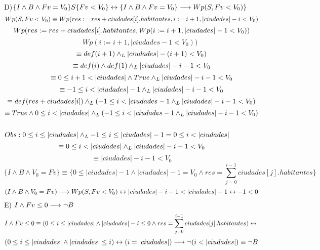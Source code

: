 \documentclass[10pt,a4paper]{article}
\begin{document}
D)$\{I \land B \land Fv = V_0\} S \{Fv < V_0\} \leftrightarrow \{I \land B \land Fv = V_0\} \longrightarrow Wp (S, Fv < V_0 )\}$\\
\[Wp(S,Fv < V_0 ) \equiv Wp(res:=res+ciudades[i].habitantes, i:=i+1,|ciudades|-i<V_0)\\ \]
\[Wp(res:= res+ciudades[i].habitantes, Wp(i:=i+1,|ciudades|-1< V_0))\\\]
\[\hspace{1cm}Wp(i:=i+1,|ciudades-1<V_0))  \]
\[\hspace{1cm}\equiv def (i+1) \land _L |ciudades|-(i+1) < V_0 )\]
\[\hspace{1cm}\equiv def(i) \land def(1) \land _L |ciudades|-i-1 < V_0 \]
\[\hspace{1cm}\equiv 0 \leq i+1< |ciudades| \land True \land _L |ciudades|-i-1 < V_0  \]
\[\hspace{1cm}\equiv -1 \leq i < |ciudades| -1 \land _L |ciudades|-i-1 < V_0  \\\]
\[\equiv def(res+ciudades[i]) \land _L (-1 \leq i < |ciudades -1 \land _L |ciudades|-i-1 < V_0)\]
\[\equiv True \land 0 \leq i < |ciudades| \land _L (-1 \leq i < |ciudades -1 \land _L |ciudades|-i-1 < V_0)\]
\\

$Obs: 0 \leq i \leq |ciudades| \land _L -1 \leq i \leq |ciudades|-1 = 0 \leq i < |ciudades|$\\
\[\equiv 0 \leq i < |ciudades| \land _L |ciudades|-i-1 < V_0\]
\[\equiv |ciudades| -i-1 < V_0\]
\[\{I \land B \land V_0 = Fv\} \equiv \{0 \leq |ciudades| -1 \land |ciudades|-1 = V_0 \land {res = \sum\limits_{j=0}^{i-1}ciudades[j].habitantes}\}\]
\[(I \land B \land V_0 = Fv) \longrightarrow Wp(S,Fv < V_0) \leftrightarrow |ciudades| -i-1 < |ciudades|-1 \leftrightarrow -1 < 0\] 
\hspace{0.5cm}E) $I \land Fv \leq 0 \longrightarrow \neg B$\\
\[I \land Fv \leq 0 \equiv (0 \leq i \leq |ciudades| \land |ciudades|-i \leq 0 \land {res = \sum\limits_{j=0}^{i-1}ciudades[j].habitantes}) \leftrightarrow\\\]
\[ (0\leq i \leq |ciudades| \land |ciudades|\leq i) \Iff (i=|ciudades|) \implica \neg(i<|ciudades|) \equiv \neg B\] \\
\end{document}
